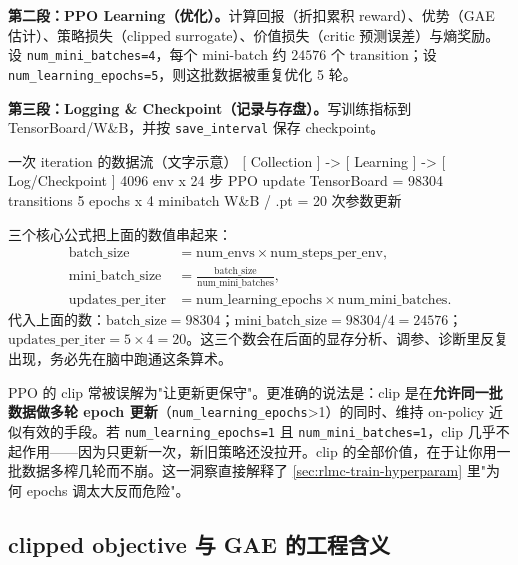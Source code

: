 \textbf{第二段：PPO Learning（优化）。}计算回报（折扣累积 reward）、优势（GAE 估计）、策略损失（clipped surrogate）、价值损失（critic 预测误差）与熵奖励。设 \verb|num_mini_batches=4|，每个 mini-batch 约 $24576$ 个 transition；设 \verb|num_learning_epochs=5|，则这批数据被重复优化 5 轮。

\textbf{第三段：Logging \& Checkpoint（记录与存盘）。}写训练指标到 TensorBoard/W\&B，并按 \verb|save_interval| 保存 checkpoint。

\begin{codebox}{一次 iteration 的数据流（文字示意）}
[ Collection ]      ->   [ Learning ]        ->   [ Log/Checkpoint ]
 4096 env x 24 步         PPO update                TensorBoard
 = 98304 transitions     5 epochs x 4 minibatch    W&B / .pt
                         = 20 次参数更新
\end{codebox}

三个核心公式把上面的数值串起来：
\begin{align}
\text{batch\_size} &= \text{num\_envs}\times\text{num\_steps\_per\_env}, \label{eq:rlmc-batch}\\
\text{mini\_batch\_size} &= \frac{\text{batch\_size}}{\text{num\_mini\_batches}}, \label{eq:rlmc-minibatch}\\
\text{updates\_per\_iter} &= \text{num\_learning\_epochs}\times\text{num\_mini\_batches}. \label{eq:rlmc-updates}
\end{align}
代入上面的数：$\text{batch\_size}=98304$；$\text{mini\_batch\_size}=98304/4=24576$；$\text{updates\_per\_iter}=5\times4=20$。这三个数会在后面的显存分析、调参、诊断里反复出现，务必先在脑中跑通这条算术。

\begin{insight}\label{ins:rlmc-clip-reuse}
PPO 的 clip 常被误解为"让更新更保守"。更准确的说法是：clip 是在\textbf{允许同一批数据做多轮 epoch 更新}（\verb|num_learning_epochs|>1）的同时、维持 on-policy 近似有效的手段。若 \verb|num_learning_epochs=1| 且 \verb|num_mini_batches=1|，clip 几乎不起作用——因为只更新一次，新旧策略还没拉开。clip 的全部价值，在于让你用一批数据多榨几轮而不崩。这一洞察直接解释了 \cref{sec:rlmc-train-hyperparam} 里"为何 epochs 调太大反而危险"。
\end{insight}

\subsection{clipped objective 与 GAE 的工程含义}

